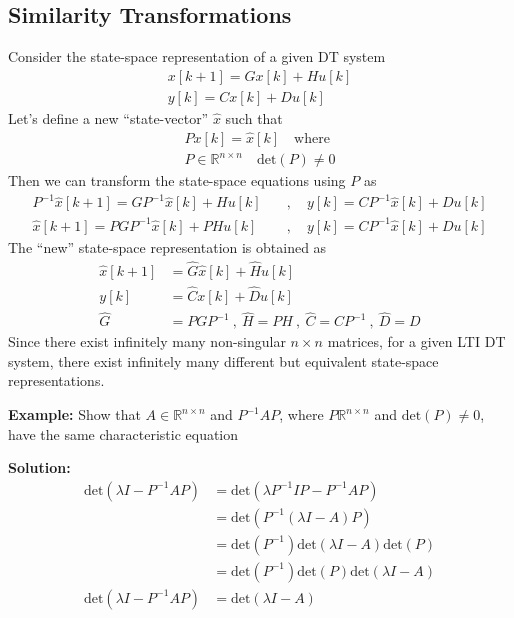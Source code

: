 \documentclass[twoside]{article}
\begin{document}
\subsection*{Similarity Transformations}

Consider the state-space representation of a 
given DT system
%
\begin{align*}
  x[k+1] = G x[k] + H u[k]
\\
  y[k] = C x[k] + D u[k]
\end{align*}
%
Let's define a new ``state-vector'' $\hat{x}$ such that
%
\begin{align*}
  P x[k] = \hat{x}[k] \quad \mathrm{where}
\\
  P \in \mathbb{R}^{n \times n} \quad \mathrm{det}(P) \neq 0
\end{align*}
%
Then we can transform the state-space equations using $P$
as
%
\begin{align*}
  P^{-1} \hat{x}[k+1] = G P^{-1} \hat{x}[k] + H u[k] 
\quad &, \quad y[k] = C P^{-1} \hat{x}[k] + D u[k]
\\
  \hat{x}[k+1] = P G P^{-1} \hat{x}[k] + P H u[k] 
\quad &, \quad y[k] = C P^{-1} \hat{x}[k] + D u[k]
\end{align*}
%
The ``new'' state-space representation is obtained as
%
\begin{align*}
  \hat{x}[k+1] &= \hat{G} \hat{x}[k] + \hat{H} u[k] 
    \\
  y[k] &= \hat{C} x[k] + \hat{D} u[k]
\\
\hat{G} &= P  G P^{-1} \ , \ \hat{H} = P  H \ , \ \hat{C} = C P^{-1} \ ,
  \ \hat{D} = D
\end{align*}
%
Since there exist infinitely many non-singular $n \times n$
matrices, for a given LTI DT system, there exist infinitely 
many different but equivalent state-space representations.

\vspace{24pt}

\textbf{Example:} Show that $A \in \mathbb{R}^{n \times n}$ and $P^{-1} A
P$, where $P \mathbb{R}^{n \times n}$ and $\mathrm{det}(P) \neq 0$, have the
same characteristic equation

\textbf{Solution:} 
\begin{align*}
  \mathrm{det}\left(\lambda I - P^{-1} A P \right) &= 
\mathrm{det}\left( \lambda P^{-1} I P - P^{-1} A P \right)
\\
&= \mathrm{det} \left( P^{-1} \left( \lambda I - A \right) P \right)
\\
&= \mathrm{det} \left( P^{-1} \right)
\mathrm{det} \left( \lambda I - A \right) 
\mathrm{det} \left( P \right)
\\
&= \mathrm{det} \left( P^{-1} \right) \mathrm{det} \left( P \right)
\mathrm{det} \left( \lambda I - A \right) 
\\
\mathrm{det}\left(\lambda I - P^{-1} A P \right) &= \mathrm{det} \left( \lambda I - A \right) 
\end{align*}
\end{document}
